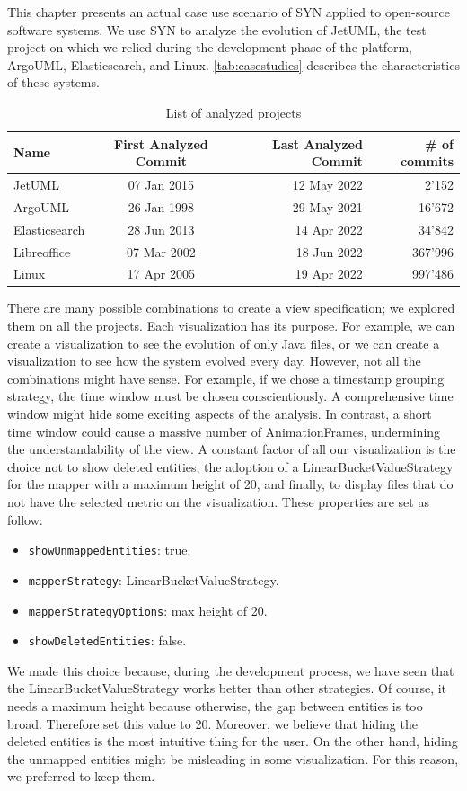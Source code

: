 This chapter presents an actual case use scenario of SYN applied to open-source software systems. 
We use SYN to analyze the evolution of JetUML, the test project on which we relied during the development phase of the platform, ArgoUML, Elasticsearch, and Linux. 
\autoref{tab:casestudies} describes the characteristics of these systems.

\begin{table}[ht]
    \centering
    \begin{tabular}{lcrr} 
        \hline
        {\bf Name} & {\bf First Analyzed Commit} & {\bf Last Analyzed Commit} & {\bf \# of commits}\\ 
        \hline
        JetUML & 07 Jan 2015 & 12 May 2022 & 2'152 \\ 
        ArgoUML & 26 Jan 1998 & 29 May 2021 & 16'672  \\
        Elasticsearch & 28 Jun 2013 & 14 Apr 2022 & 34'842  \\
        Libreoffice & 07 Mar 2002 & 18 Jun 2022 & 367'996  \\
        Linux & 17 Apr 2005 & 19 Apr 2022 & 997'486  
    \end{tabular}
    \caption{List of analyzed projects}
    \label{tab:casestudies}
\end{table}

\bigbreak
There are many possible combinations to create a view specification; we explored them on all the projects. 
Each visualization has its purpose. For example, we can create a visualization to see the evolution of only Java files, or we can create a visualization to see how the system evolved every day. 
However, not all the combinations might have sense. For example, if we chose a timestamp grouping strategy, the time window must be chosen conscientiously. 
A comprehensive time window might hide some exciting aspects of the analysis. In contrast, a short time window could cause a massive number of AnimationFrames, undermining the understandability of the view. 
\bigbreak
A constant factor of all our visualization is the choice not to show deleted entities, the adoption of a LinearBucketValueStrategy for the mapper with a maximum height of 20, and finally, to display files that do not have the selected metric on the visualization. 
These properties are set as follow:
\begin{itemize}
    \item \texttt{showUnmappedEntities}: true.
    \item \texttt{mapperStrategy}: LinearBucketValueStrategy.
    \item \texttt{mapperStrategyOptions}: max height of 20.
    \item \texttt{showDeletedEntities}: false.
\end{itemize}
We made this choice because, during the development process, we have seen that the LinearBucketValueStrategy works better than other strategies. Of course, it needs a maximum height because otherwise, the gap between entities is too broad. Therefore set this value to 20. Moreover, we believe that hiding the deleted entities is the most intuitive thing for the user. On the other hand, hiding the unmapped entities might be misleading in some visualization. For this reason, we preferred to keep them. 


